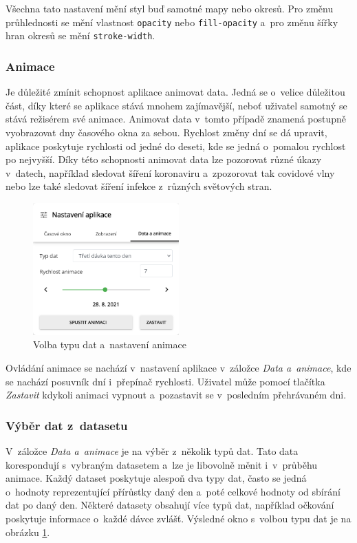 Všechna tato nastavení mění styl buď samotné mapy nebo okresů. Pro změnu průhlednosti se mění vlastnost \texttt{opacity} nebo \texttt{fill-opacity} a~pro změnu šířky hran okresů se mění \texttt{stroke-width}. 

\subsubsection*{Animace}

Je důležité zmínit schopnost aplikace animovat data. Jedná se o~velice důležitou část, díky které se aplikace stává mnohem zajímavější, neboť uživatel samotný se stává režisérem své animace. Animovat data v~tomto případě znamená postupně vyobrazovat dny časového okna za sebou. Rychlost změny dní se dá upravit, aplikace poskytuje rychlosti od jedné do deseti, kde se jedná o~pomalou rychlost po nejvyšší. Díky této schopnosti animovat data lze pozorovat různé úkazy v~datech, například sledovat šíření koronaviru a~zpozorovat tak covidové vlny nebo lze také sledovat šíření infekce z~různých světových stran.

\begin{figure}[h]
	\centering
	\includegraphics[width=0.5\textwidth]{Pictures/animace.png}
	\caption{Volba typu dat a~nastavení animace}
	\label{fig:AnimationSettings}
\end{figure}

Ovládání animace se nachází v~nastavení aplikace v~záložce \emph{Data a~animace}, kde se nachází posuvník dní i~přepínač rychlosti. Uživatel může pomocí tlačítka \emph{Zastavit} kdykoli animaci vypnout a~pozastavit se v~posledním přehrávaném dni.

\subsubsection*{Výběr dat z~datasetu}

V~záložce \emph{Data a~animace} je na výběr z~několik typů dat. Tato data korespondují s~vybraným datasetem a~lze je libovolně měnit i~v~průběhu animace. Každý dataset poskytuje alespoň dva typy dat, často se jedná o~hodnoty reprezentující přírůstky daný den a~poté celkové hodnoty od sbírání dat po daný den. Některé datasety obsahují více typů dat, například očkování poskytuje informace o~každé dávce zvlášť. Výsledné okno s~volbou typu dat je na obrázku \ref{fig:AnimationSettings}.

